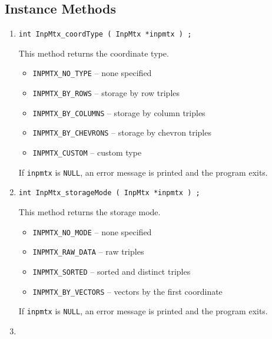 \subsection{Instance Methods}
\label{subsection:InpMtx:proto:instance}
\par
\begin{enumerate}
\item
\begin{verbatim}
int InpMtx_coordType ( InpMtx *inpmtx ) ;
\end{verbatim}
This method returns the coordinate type.
\begin{itemize}
\item {\tt INPMTX\_NO\_TYPE} -- none specified
\item {\tt INPMTX\_BY\_ROWS} -- storage by row triples
\item {\tt INPMTX\_BY\_COLUMNS} -- storage by column triples
\item {\tt INPMTX\_BY\_CHEVRONS} -- storage by chevron triples
\item {\tt INPMTX\_CUSTOM} -- custom type
\end{itemize}
\par {}
If {\tt inpmtx} is {\tt NULL},
an error message is printed and the program exits.
\item
\begin{verbatim}
int InpMtx_storageMode ( InpMtx *inpmtx ) ;
\end{verbatim}
This method returns the storage mode.
\begin{itemize}
\item {\tt INPMTX\_NO\_MODE} -- none specified
\item {\tt INPMTX\_RAW\_DATA} -- raw triples
\item {\tt INPMTX\_SORTED} -- sorted and distinct triples
\item {\tt INPMTX\_BY\_VECTORS} -- vectors by the first coordinate
\end{itemize}
\par {}
If {\tt inpmtx} is {\tt NULL},
an error message is printed and the program exits.
\item

\end{enumerate}

